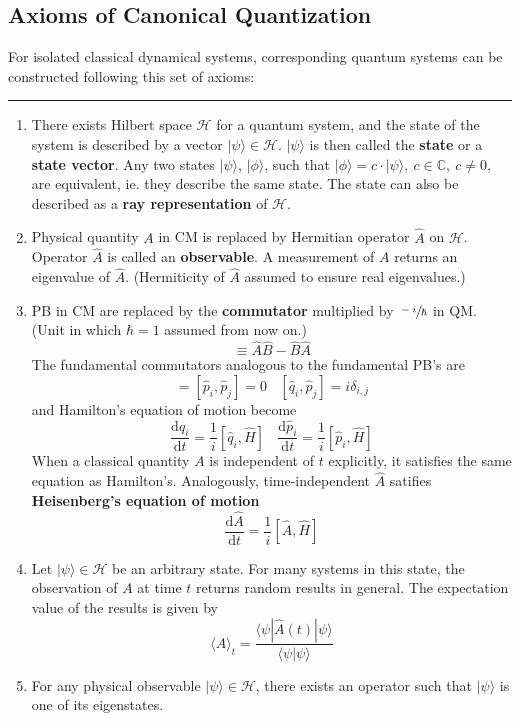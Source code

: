 \documentclass{article}
\begin{document}
\subsection{Axioms of Canonical Quantization}
For isolated classical dynamical systems, corresponding quantum systems can be constructed following this set of axioms:\\
\hrule
\begin{enumerate}
\item There exists Hilbert space $\mathcal{H}$ for a quantum system, and the state of the system is described by a vector $|\psi\rangle\in\mathcal{H}$. $|\psi\rangle$ is then called the \textbf{state} or a \textbf{state vector}. Any two states $|\psi\rangle$, $|\phi\rangle$, such that $|\phi\rangle = c\cdot|\psi\rangle,~c\in\mathbb{C},~c\neq 0$, are equivalent, ie. they describe the same state. The state can also be described as a \textbf{ray representation} of $\mathcal{H}$.\\
\item Physical quantity $A$ in CM is replaced by Hermitian operator $\hat{A}$ on $\mathcal{H}$. Operator $\hat{A}$ is called an \textbf{observable}. A measurement of $A$ returns an eigenvalue of $\hat{A}$. (Hermiticity of $\hat{A}$ assumed to ensure real eigenvalues.)
\item PB in CM are replaced by the \textbf{commutator} multiplied by $\sfrac{-i}{\hbar}$ in QM. (Unit in which $\hbar=1$ assumed from now on.)
\begin{equation}
[\hat{A},\hat{B}]\equiv\hat{A}\hat{B}-\hat{B}\hat{A}
\label{commutator}
\end{equation}
The fundamental commutators analogous to the fundamental PB's are
\begin{equation}
[\hat{q}_i,\hat{q}_j]=[\hat{p}_i,\hat{p}_j]=0~~~~[\hat{q}_i, \hat{p}_j]=i\delta_{i,j}
\label{eq: fundcom}
\end{equation}
and Hamilton's equation of motion become
\begin{equation}
\frac{\mathrm{d}\hat{q}_i}{\mathrm{d}t}=\frac{1}{i}[\hat{q}_i,\hat{H}]~~~~\frac{\mathrm{d}\hat{p}_i}{\mathrm{d}t}=\frac{1}{i}[\hat{p}_i,\hat{H}]
\label{eq: HamEqns}
\end{equation}
When a classical quantity $A$ is independent of $t$ explicitly, it satisfies the same equation as Hamilton's. Analogously, time-independent $\hat{A}$ satifies \textbf{Heisenberg's equation of motion}
\begin{equation}
\frac{\mathrm{d}\hat{A}}{\mathrm{d}t}=\frac{1}{i}[\hat{A}, \hat{H}]
\label{eq: HeisenbergEqnofMotion}
\end{equation}
\item Let $|\psi\rangle\in\mathcal{H}$ be an arbitrary state. For many systems in this state, the observation of $A$ at time $t$ returns random results in general. The expectation value of the results is given by 
\begin{equation}
\langle A\rangle_t=\frac{\langle\psi|\hat{A}(t)|\psi\rangle}{\langle\psi|\psi\rangle}
\end{equation}
\item For any physical observable $|\psi\rangle\in\mathcal{H}$, there exists an operator such that $|\psi\rangle$ is one of its eigenstates.
\end{enumerate}
\end{document}
